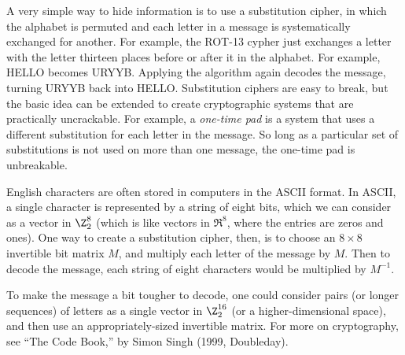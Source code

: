 \begin{remark}  
A very simple way to hide information is to use a substitution cipher, in which the alphabet is permuted and each letter in a message is systematically exchanged for another.  For example, the ROT-13 cypher just exchanges a letter with the letter thirteen places before or after it in the alphabet.  For example, HELLO becomes URYYB.  Applying the algorithm again decodes the message, turning URYYB back into HELLO.  Substitution ciphers are easy to break, but the basic idea can be extended to create cryptographic systems that are practically uncrackable.  For example, a \emph{one-time pad} is a system that uses a different substitution for each letter in the message.  So long as a particular set of substitutions is not used on more than one message, the one-time pad is unbreakable.

English characters are often stored in computers in the ASCII format.  In ASCII, a single character is represented by a string of eight bits, which we can consider as a vector in $\Z_2^8$ (which is like vectors in $\Re^8$, where the entries are zeros and ones).  One way to create a substitution cipher, then, is to choose an $8\times 8$ invertible bit matrix $M$, and multiply each letter of the message by $M$.  Then to decode the message, each string of eight characters would be multiplied by $M^{-1}$.  

To make the message a bit tougher to decode, one could consider pairs (or longer sequences) of letters as a single vector in $\Z_2^{16}$ (or a higher-dimensional space), and then use an appropriately-sized invertible matrix.
For more on cryptography, see ``The Code Book,'' by Simon Singh (1999, Doubleday).
\end{remark}

%
%
%
%
